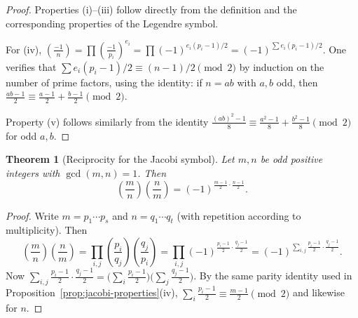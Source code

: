 \documentclass[12pt,a4paper,openany]{book}
\theoremstyle{definition}
\theoremstyle{plain}
\newtheorem{theorem}[definition]{Theorem}
\theoremstyle{remark}
\newcommand{\legendre}[2]{\left(\frac{#1}{#2}\right)}
\newcommand{\jacobi}[2]{\left(\frac{#1}{#2}\right)}
\begin{document}
\begin{proof}
Properties (i)--(iii) follow directly from the definition and the corresponding
properties of the Legendre symbol.

For (iv), $\jacobi{-1}{n} = \prod \legendre{-1}{p_i}^{e_i} = \prod (-1)^{e_i(p_i-1)/2}
= (-1)^{\sum e_i(p_i-1)/2}$.
One verifies that $\sum e_i(p_i-1)/2 \equiv (n-1)/2 \pmod{2}$ by induction on the
number of prime factors, using the identity: if $n = ab$ with $a, b$ odd, then
$\frac{ab-1}{2} \equiv \frac{a-1}{2} + \frac{b-1}{2} \pmod{2}$.

Property (v) follows similarly from the identity
$\frac{(ab)^2 - 1}{8} \equiv \frac{a^2-1}{8} + \frac{b^2-1}{8} \pmod{2}$
for odd $a, b$.
\end{proof}

\begin{theorem}[Reciprocity for the Jacobi symbol]
\label{thm:jacobi-reciprocity}
Let $m, n$ be odd positive integers with $\gcd(m, n) = 1$. Then
\begin{equation}
\label{eq:jacobi-reciprocity}
  \jacobi{m}{n}\jacobi{n}{m} = (-1)^{\frac{m-1}{2}\cdot\frac{n-1}{2}}.
\end{equation}
\end{theorem}

\begin{proof}
Write $m = p_1 \cdots p_s$ and $n = q_1 \cdots q_t$ (with repetition according
to multiplicity). Then
\[
  \jacobi{m}{n}\jacobi{n}{m}
  = \prod_{i,j} \legendre{p_i}{q_j}\legendre{q_j}{p_i}
  = \prod_{i,j} (-1)^{\frac{p_i-1}{2}\cdot\frac{q_j-1}{2}}
  = (-1)^{\sum_{i,j}\frac{p_i-1}{2}\cdot\frac{q_j-1}{2}}.
\]
Now $\sum_{i,j} \frac{p_i-1}{2}\cdot\frac{q_j-1}{2}
= \bigl(\sum_i \frac{p_i-1}{2}\bigr)\bigl(\sum_j \frac{q_j-1}{2}\bigr)$.
By the same parity identity used in Proposition~\ref{prop:jacobi-properties}(iv),
$\sum_i \frac{p_i-1}{2} \equiv \frac{m-1}{2} \pmod{2}$ and likewise for $n$.
\end{proof}
\end{document}
